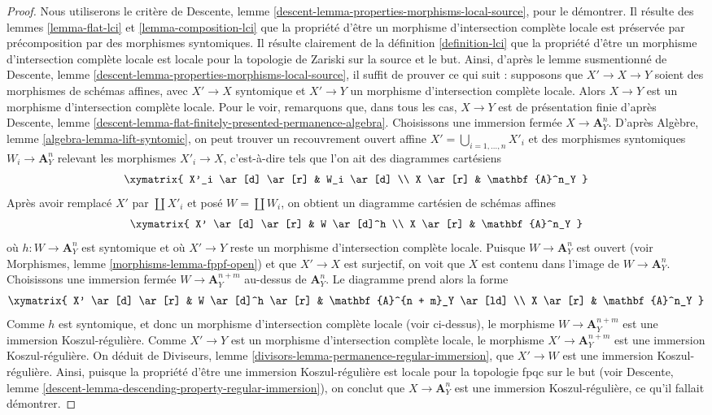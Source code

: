 \begin{proof}
Nous utiliserons le critère de
Descente, lemme \ref{descent-lemma-properties-morphisms-local-source},
pour le démontrer. Il résulte des
lemmes \ref{lemma-flat-lci} et
\ref{lemma-composition-lci}
que la propriété d'être un morphisme d'intersection complète locale est préservée par
précomposition par des morphismes syntomiques. Il résulte clairement de la
définition \ref{definition-lci}
que la propriété d'être un morphisme d'intersection complète locale est locale pour la topologie de Zariski sur la
source et le but. Ainsi, d'après le lemme susmentionné de
Descente, lemme \ref{descent-lemma-properties-morphisms-local-source},
il suffit de prouver ce qui suit : supposons que $X' \to X \to Y$ soient des
morphismes de schémas affines, avec $X' \to X$ syntomique et $X' \to Y$
un morphisme d'intersection complète locale. Alors $X \to Y$ est un morphisme d'intersection complète
locale. Pour le voir, remarquons que, dans tous les cas, $X \to Y$ est de
présentation finie d'après
Descente, lemme \ref{descent-lemma-flat-finitely-presented-permanence-algebra}.
Choisissons une immersion fermée $X \to \mathbf{A}^n_Y$. D'après
Algèbre, lemme \ref{algebra-lemma-lift-syntomic},
on peut trouver un recouvrement ouvert affine $X' = \bigcup_{i = 1, \ldots, n} X'_i$
et des morphismes syntomiques $W_i \to \mathbf{A}^n_Y$ relevant les morphismes
$X'_i \to X$, c'est-à-dire tels que l'on ait des diagrammes cartésiens
$$
\xymatrix{
X'_i \ar[d] \ar[r] & W_i \ar[d] \\
X \ar[r] & \mathbf{A}^n_Y
}
$$
Après avoir remplacé $X'$ par $\coprod X'_i$ et posé $W = \coprod W_i$,
on obtient un diagramme cartésien de schémas affines
$$
\xymatrix{
X' \ar[d] \ar[r] & W \ar[d]^h \\
X \ar[r] & \mathbf{A}^n_Y
}
$$
où $h : W \to \mathbf{A}^n_Y$ est syntomique et où $X' \to Y$ reste un morphisme d'intersection
complète locale. Puisque $W \to \mathbf{A}^n_Y$ est ouvert (voir
Morphismes, lemme \ref{morphisms-lemma-fppf-open})
et que $X' \to X$ est surjectif, on voit que $X$ est contenu dans l'image
de $W \to \mathbf{A}^n_Y$. Choisissons une immersion fermée
$W \to \mathbf{A}^{n + m}_Y$ au-dessus de $\mathbf{A}^n_Y$. Le diagramme prend alors la forme
$$
\xymatrix{
X' \ar[d] \ar[r] & W \ar[d]^h \ar[r] & \mathbf{A}^{n + m}_Y \ar[ld] \\
X \ar[r] & \mathbf{A}^n_Y
}
$$
Comme $h$ est syntomique, et donc un morphisme d'intersection complète locale (voir
ci-dessus), le morphisme $W \to \mathbf{A}^{n + m}_Y$ est une immersion Koszul-régulière.
Comme $X' \to Y$ est un morphisme d'intersection complète locale, le morphisme
$X' \to \mathbf{A}^{n + m}_Y$ est une immersion Koszul-régulière. On déduit de
Diviseurs, lemme \ref{divisors-lemma-permanence-regular-immersion},
que $X' \to W$ est une immersion Koszul-régulière. Ainsi, puisque la propriété d'être
une immersion Koszul-régulière est locale pour la topologie fpqc sur le but (voir
Descente, lemme \ref{descent-lemma-descending-property-regular-immersion}),
on conclut que $X \to \mathbf{A}^n_Y$ est une immersion Koszul-régulière,
ce qu'il fallait démontrer.
\end{proof}

